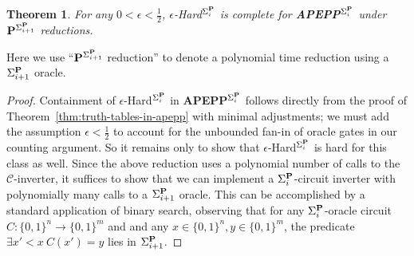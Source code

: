 \documentclass[11pt]{article}
\newtheorem{theorem}{Theorem}
\def\cl{\bf}
\begin{document}
\begin{theorem}
For any $0 < \epsilon < \frac{1}{2}$, {\sc $\epsilon$-Hard}$^{\Sigma^{\cl P}_i}$ is complete for {\cl APEPP}$^{\Sigma^{\cl P}_i}$ under ${\cl P}^{\Sigma_{i+1}^{\cl P}}$ reductions.
\end{theorem}
Here we use ``${\cl P}^{\Sigma_{i+1}^{\cl P}}$ reduction'' to denote a polynomial time reduction using a $\Sigma_{i+1}^{\cl P}$ oracle.
\begin{proof}
Containment of {\sc $\epsilon$-Hard}$^{\Sigma^{\cl P}_i}$ in {\cl APEPP}$^{\Sigma^{\cl P}_i}$ follows directly from the proof of Theorem~\ref{thm:truth-tables-in-apepp} with minimal adjustments; we must add the assumption $\epsilon < \frac{1}{2}$ to account for the unbounded fan-in of oracle gates in our counting argument. So it remains only to show that {\sc $\epsilon$-Hard}$^{\Sigma^{\cl P}_i}$ is hard for this class as well. Since the above reduction uses a polynomial number of calls to the $\mathcal{C}$-inverter, it suffices to show that we can implement a $\Sigma^{\cl P}_i$-circuit inverter with polynomially many calls to a $\Sigma_{i+1}^{\cl P}$ oracle. This can be accomplished by a standard application of binary search, observing that for any $\Sigma^{\cl P}_i$-oracle circuit $C: \{0,1\}^n \to \{0,1\}^m$ and and any $x\in \{0,1\}^n, y \in \{0,1\}^m$, the predicate $\exists x'<x \: C(x')=y$ lies in $\Sigma^{\cl P}_{i+1}$.


\end{proof}
\end{document}
